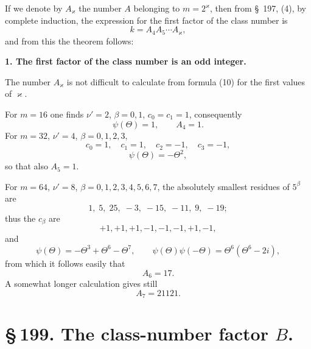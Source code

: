 \documentclass[11pt]{article}
\begin{document}
If we denote by $A_\varkappa$ the number $A$ belonging to $m=2^\varkappa$, then from \S~197, (4), by complete induction, the expression for the first factor of the class number is
\begin{equation}
k=A_4A_5\cdots A_\varkappa,
\tag{14}
\end{equation}
and from this the theorem follows:
\begin{center}
\textbf{1. The first factor of the class number is an odd integer.}
\end{center}
The number $A_\varkappa$ is not difficult to calculate from formula (10) for the first values of $\varkappa$.

For $m=16$ one finds $\nu'=2$, $\beta=0,1$, $c_0=c_1=1$, consequently
\[
\psi(\Theta)=1,
\qquad
A_4=1.
\]
For $m=32$, $\nu'=4$, $\beta=0,1,2,3$,
\[
c_0=1,
\quad c_1=1,
\quad c_2=-1,
\quad c_3=-1,
\]
\[
\psi(\Theta)=-\Theta^2,
\]
so that also $A_5=1$.

For $m=64$, $\nu'=8$, $\beta=0,1,2,3,4,5,6,7$, the absolutely smallest residues of $5^\beta$ are
\[
1,\;5,\;25,\;-3,\;-15,\;-11,\;9,\;-19;
\]
thus the $c_\beta$ are
\[
+1,+1,+1,-1,-1,-1,+1,-1,
\]
and
\[
\psi(\Theta)=-\Theta^3+\Theta^6-\Theta^7,
\qquad
\psi(\Theta)\psi(-\Theta)=\Theta^6(\Theta^6-2i),
\]
from which it follows easily that
\[
A_6=17.
\]
A somewhat longer calculation gives still
\[
A_7=21121.
\]

\section*{\S\,199. The class-number factor $B$.}
\end{document}
